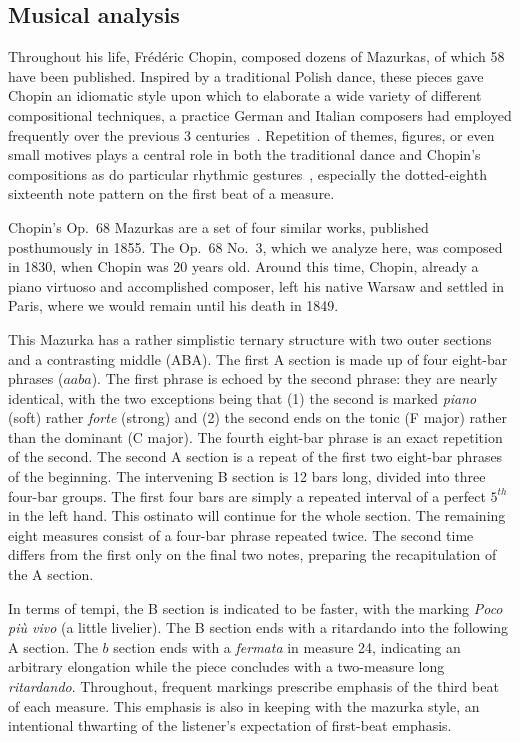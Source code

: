 \documentclass[12pt]{article}
\begin{document}
\subsection{Musical analysis}
\label{sec:musical-analysis}

Throughout his life, Fr\'ed\'eric Chopin, composed dozens of Mazurkas,
of which 58 have been published. Inspired by a traditional Polish
dance, these pieces gave Chopin an idiomatic style upon which to
elaborate a wide variety of different compositional techniques, a
practice German and Italian composers had employed frequently over the previous 3
centuries~\citep{BurkholderGrout2014}. Repetition of themes, figures, or even small motives plays
a central role in both the traditional dance and Chopin's compositions
as do particular rhythmic gestures~\citep{Kallberg1996}, especially the
dotted-eighth sixteenth note pattern on the first beat of a measure. 

Chopin's Op.\ 68 Mazurkas are a set of four similar works, published
posthumously in 1855. The Op.\ 68 No.\ 3, which we analyze here, was
composed in 1830, when Chopin was 20 years old. Around this time,
Chopin, already a piano virtuoso and accomplished composer, left his
native Warsaw and settled in Paris, where we would remain until his
death in 1849.

This Mazurka has a rather simplistic ternary structure with two outer
sections and a contrasting middle (ABA). The first A section is made
up of four eight-bar phrases ($aaba$). The first phrase is echoed by the
second phrase: they are nearly identical, with the two exceptions
being that (1) the
second is marked {\em piano} (soft) rather {\em forte} (strong) and (2)
the second ends on the tonic (F major) rather than the dominant
(C major). The fourth eight-bar phrase is an exact repetition of the
second. The second A section is a repeat of the first two
eight-bar phrases of the beginning. The intervening B section is 12
bars long, divided into three four-bar groups. The first four bars are
simply a repeated interval of a perfect $5^{th}$ in the left
hand. This ostinato will continue for the whole section. The remaining
eight measures consist of a four-bar phrase repeated twice. The second
time differs from the first only on the final two notes, preparing the
recapitulation of the A section.

In terms of tempi, the B section is indicated to be faster, with the
marking {\em Poco pi\`u vivo} (a little livelier). The B section ends
with a ritardando into the following A section. The $b$ section ends
with a {\em fermata} in measure 24, indicating an arbitrary
elongation while the piece
concludes with a two-measure long {\em ritardando}. Throughout, 
frequent markings prescribe emphasis of the third beat of each measure. This
emphasis is also in keeping with the mazurka style, an intentional
thwarting of the listener's expectation of first-beat emphasis.
\end{document}
